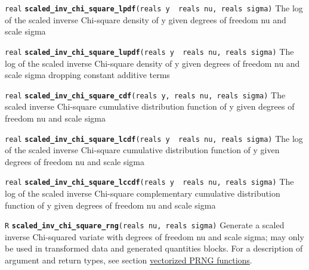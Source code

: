 \documentclass[
  10pt,
]{book}
\begin{document}
\texttt{real} \textbf{\texttt{scaled\_inv\_chi\_square\_lpdf}}\texttt{(reals\ y\ \textbar{}\ reals\ nu,\ reals\ sigma)}\newline
The log of the scaled inverse Chi-square density of y given degrees of
freedom nu and scale sigma


\texttt{real} \textbf{\texttt{scaled\_inv\_chi\_square\_lupdf}}\texttt{(reals\ y\ \textbar{}\ reals\ nu,\ reals\ sigma)}\newline
The log of the scaled inverse Chi-square density of y given degrees of
freedom nu and scale sigma dropping constant additive terms


\texttt{real} \textbf{\texttt{scaled\_inv\_chi\_square\_cdf}}\texttt{(reals\ y,\ reals\ nu,\ reals\ sigma)}\newline
The scaled inverse Chi-square cumulative distribution function of y
given degrees of freedom nu and scale sigma


\texttt{real} \textbf{\texttt{scaled\_inv\_chi\_square\_lcdf}}\texttt{(reals\ y\ \textbar{}\ reals\ nu,\ reals\ sigma)}\newline
The log of the scaled inverse Chi-square cumulative distribution
function of y given degrees of freedom nu and scale sigma


\texttt{real} \textbf{\texttt{scaled\_inv\_chi\_square\_lccdf}}\texttt{(reals\ y\ \textbar{}\ reals\ nu,\ reals\ sigma)}\newline
The log of the scaled inverse Chi-square complementary cumulative
distribution function of y given degrees of freedom nu and scale sigma


\texttt{R} \textbf{\texttt{scaled\_inv\_chi\_square\_rng}}\texttt{(reals\ nu,\ reals\ sigma)}\newline
Generate a scaled inverse Chi-squared variate with degrees of freedom
nu and scale sigma; may only be used in transformed data and generated
quantities blocks. For a description of argument and return types, see section
\protect\hyperlink{prng-vectorization}{vectorized PRNG functions}.
\end{document}
